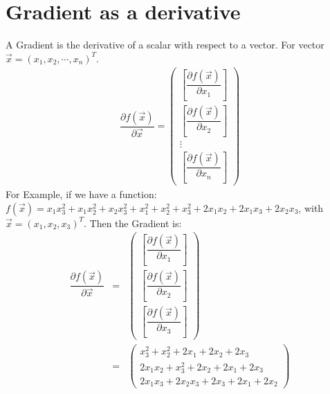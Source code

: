 \documentclass[conference,final,11pt,technote,onecolumn]{IEEEtran}\usepackage[]{graphicx}\usepackage[]{color}
\begin{document}
\section{Gradient as a derivative}
\label{term:Gradient_as_a_derivative}
A Gradient is the derivative of a scalar with respect to a vector. For vector $\vec x = (x_1, x_2, \cdots, x_n)^T$.
\begin{eqnarray}
\nonumber \dfrac{\partial f(\vec x)}{\partial \vec x} = \begin{pmatrix} \left[ \dfrac{\partial f(\vec x)}{\partial x_1}\right]\\
\left[ \dfrac{\partial f(\vec x)}{\partial x_2}\right]\\
\vdots\\
\left[ \dfrac{\partial f(\vec x)}{\partial x_n}\right] \end{pmatrix}
\end{eqnarray}
For Example, if we have a function: $f(\vec x) = x_1x^2_3 + x_1x^2_2 + x_2x^2_3 + x^2_1 + x^2_2 + x^2_3 + 2x_1x_2 + 2x_1x_3 + 2x_2x_3$, with $\vec x = (x_1, x_2, x_3)^T$.  Then the Gradient is:
\begin{eqnarray}
\nonumber \dfrac{\partial f(\vec x)}{\partial \vec x} &=& \begin{pmatrix}\left[ \dfrac{\partial f(\vec x)}{\partial x_1}\right]\\
\left[ \dfrac{\partial f(\vec x)}{\partial x_2}\right]\\
\left[ \dfrac{\partial f(\vec x)}{\partial x_3}\right]\end{pmatrix}\\
\nonumber &=& \begin{pmatrix}
x^2_3+x^2_2+2x_1+2x_2+2x_3\\
2x_1x_2+x^2_3+2x_2+2x_1+2x_3\\
2x_1x_3+2x_2x_3+2x_3+2x_1+2x_2
\end{pmatrix}
\end{eqnarray}
\end{document}
